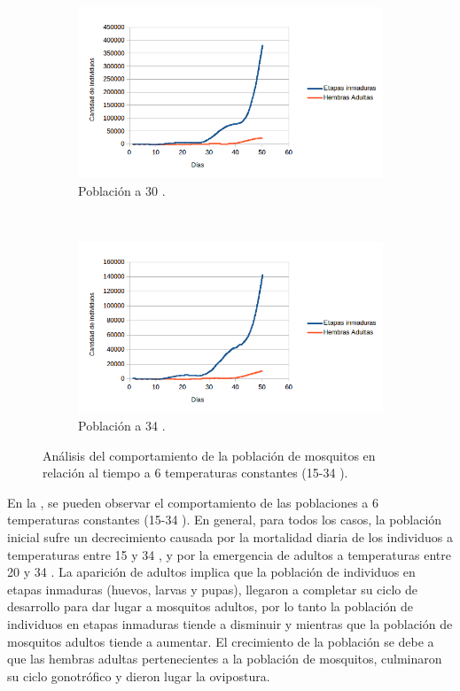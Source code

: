 \begin{figure}[!htbp]
    \begin{subfigure}[b]{0.45\textwidth}
            \includegraphics[width=\textwidth]{capitulo-6/graphics/desarrollo-poblacion-30.png}
            \caption{\label{fig:desarrollo-poblacion-30}Población a 30 \textcelsius.}
    \end{subfigure}
    ~~~~
    \begin{subfigure}[b]{0.45\textwidth}
            \includegraphics[width=\textwidth]{capitulo-6/graphics/desarrollo-poblacion-34.png}
            \caption{\label{fig:desarrollo-poblacion-34}Población a 34 \textcelsius.}
    \end{subfigure}

    \caption{\label{fig:desarrollo-poblacion-all} Análisis del comportamiento de la población de mosquitos en relación al tiempo a 6 temperaturas constantes (15-34 \textcelsius).}
\end{figure}

En la , se pueden observar el comportamiento de las
poblaciones a 6 temperaturas constantes (15-34 \textcelsius). En general, para todos los casos, la
población inicial sufre un decrecimiento causada por la mortalidad diaria de los individuos a
temperaturas entre 15 y 34 \textcelsius, y por la emergencia de adultos a temperaturas entre 20 y
34 \textcelsius. La aparición de adultos implica que la población de individuos en etapas
inmaduras (huevos, larvas y pupas), llegaron a completar su ciclo de desarrollo para dar lugar a
mosquitos adultos, por lo tanto la población de individuos en etapas inmaduras tiende a disminuir
y mientras que la población de mosquitos adultos tiende a aumentar. El crecimiento de la población
se debe a que las hembras adultas pertenecientes a la población de mosquitos, culminaron su ciclo
gonotrófico y dieron lugar la ovipostura.

